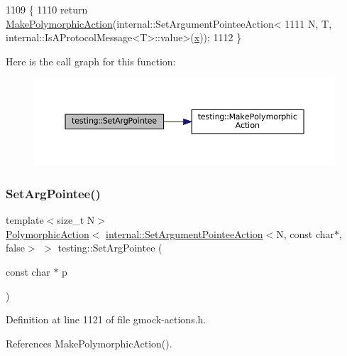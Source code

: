\begin{DoxyCode}
1109                           \{
1110   \textcolor{keywordflow}{return} \hyperlink{namespacetesting_a36bd06c5ea972c6df0bd9f40a7a94c65}{MakePolymorphicAction}(internal::SetArgumentPointeeAction<
1111       N, T, internal::IsAProtocolMessage<T>::value>(\hyperlink{namespaceinteractive__marker_acda52804aef30b460a72fb21ee01d69d}{x}));
1112 \}
\end{DoxyCode}
Here is the call graph for this function\+:
\nopagebreak
\begin{figure}[H]
\begin{center}
\leavevmode
\includegraphics[width=350pt]{namespacetesting_a5740a5033b88c37666fcd09a269d123f_cgraph}
\end{center}
\end{figure}
\mbox{\label{namespacetesting_a4a190fd2d02fb7cd79c5b3df3f80b647}} 
\subsubsection{\texorpdfstring{Set\+Arg\+Pointee()}{SetArgPointee()}\hspace{0.1cm}{\footnotesize\ttfamily [2/3]}}
{\footnotesize\ttfamily template$<$size\+\_\+t N$>$ \\
\hyperlink{classtesting_1_1PolymorphicAction}{Polymorphic\+Action}$<$ \hyperlink{classtesting_1_1internal_1_1SetArgumentPointeeAction}{internal\+::\+Set\+Argument\+Pointee\+Action}$<$N, const char$\ast$, false$>$ $>$ testing\+::\+Set\+Arg\+Pointee (\begin{DoxyParamCaption}\item[{const char $\ast$}]{p }\end{DoxyParamCaption})}



Definition at line 1121 of file gmock-\/actions.\+h.



References Make\+Polymorphic\+Action().


